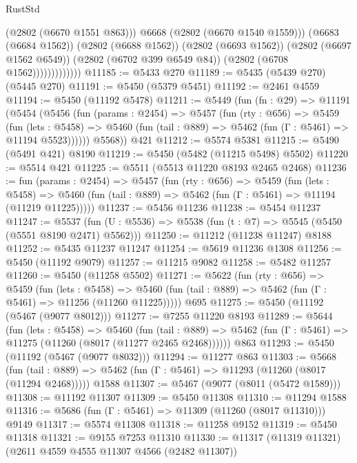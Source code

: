 \begin{lexlean}{RustStd}
\begin{coremodule}
                              (@2802 (@6670 @1551 @863)))
                            @6668
                            (@2802 (@6670 @1540 @1559)))
                          (@6683 (@6684 @1562))
                          (@2802 (@6688 @1562))
                          (@2802 (@6693 @1562))
                          (@2802 (@6697 @1562 @6549))
                          (@2802 (@6702 @399 @6549 @84))
                          (@2802 (@6708 @1562)))))))))))))
@11185 := @5433 @270
@11189 := @5435 (@5439 @270) (@5445 @270)
@11191 := @5450 (@5379 @5451)
@11192 := @2461 @4559
@11194 := @5450 (@11192 @5478)
@11211 := @5449
    (fun (fn : @29) =>
    @11191
      (@5454
        (@5456
          (fun (params : @2454) =>
          @5457
            (fun (rty : @656) =>
            @5459
              (fun (lets : @5458) =>
              @5460 (fun (tail : @889) => @5462 (fun (Γ : @5461) => @11194 @5523))))))
        @5568))
    @421
@11212 := @5574 @5381
@11215 := @5490 (@5491 @421) @8190
@11219 := @5450 (@5482 (@11215 @5498) @5502)
@11220 := @5514 @421
@11225 := @5511 (@5513 @11220 @8193 @2465 @2468)
@11236 := fun (params : @2454) =>
  @5457
    (fun (rty : @656) =>
    @5459
      (fun (lets : @5458) =>
      @5460 (fun (tail : @889) => @5462 (fun (Γ : @5461) => @11194 (@11219 @11225)))))
@11237 := @5456 @11236
@11238 := @5454 @11237
@11247 := @5537 (fun (U : @5536) => @5538 (fun (t : @7) => @5545 (@5450 (@5551 @8190 @2471) @5562)))
@11250 := @11212 (@11238 @11247) @8188
@11252 := @5435 @11237 @11247
@11254 := @5619 @11236 @1308
@11256 := @5450 (@11192 @9079)
@11257 := @11215 @9082
@11258 := @5482 @11257
@11260 := @5450 (@11258 @5502)
@11271 := @5622
    (fun (rty : @656) =>
    @5459
      (fun (lets : @5458) =>
      @5460 (fun (tail : @889) => @5462 (fun (Γ : @5461) => @11256 (@11260 @11225)))))
    @695
@11275 := @5450 (@11192 (@5467 (@9077 @8012)))
@11277 := @7255 @11220 @8193
@11289 := @5644
    (fun (lets : @5458) =>
    @5460
      (fun (tail : @889) =>
      @5462 (fun (Γ : @5461) => @11275 (@11260 (@8017 (@11277 @2465 @2468))))))
    @863
@11293 := @5450 (@11192 (@5467 (@9077 @8032)))
@11294 := @11277 @863
@11303 := @5668
    (fun (tail : @889) => @5462 (fun (Γ : @5461) => @11293 (@11260 (@8017 (@11294 @2468)))))
    @1588
@11307 := @5467 (@9077 (@8011 (@5472 @1589)))
@11308 := @11192 @11307
@11309 := @5450 @11308
@11310 := @11294 @1588
@11316 := @5686 (fun (Γ : @5461) => @11309 (@11260 (@8017 @11310))) @9149
@11317 := @5574 @11308
@11318 := @11258 @9152
@11319 := @5450 @11318
@11321 := @9155 @7253 @11310
@11330 := @11317 (@11319 @11321) (@2611 @4559 @4555 @11307 @4566 (@2482 @11307))

\end{coremodule}
\end{lexlean}
